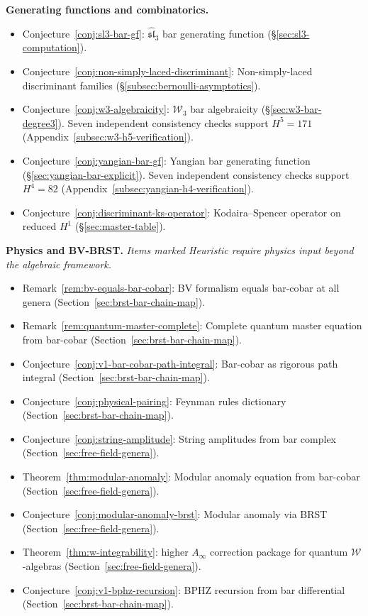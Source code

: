 \smallskip
\noindent\textbf{Generating functions and combinatorics.}
\begin{itemize}[nosep]
\item Conjecture~\ref{conj:sl3-bar-gf}:
 $\widehat{\mathfrak{sl}}_3$ bar generating function
 (\S\ref{sec:sl3-computation}).
\item Conjecture~\ref{conj:non-simply-laced-discriminant}:
 Non-simply-laced discriminant families
 (\S\ref{subsec:bernoulli-asymptotics}).
\item Conjecture~\ref{conj:w3-algebraicity}:
 $\mathcal{W}_3$ bar algebraicity
 (\S\ref{sec:w3-bar-degree3}).
 Seven independent consistency checks support $H^5 = 171$
 (Appendix~\ref{subsec:w3-h5-verification}).
\item Conjecture~\ref{conj:yangian-bar-gf}:
 Yangian bar generating function
 (\S\ref{sec:yangian-bar-explicit}).
 Seven independent consistency checks support $H^4 = 82$
 (Appendix~\ref{subsec:yangian-h4-verification}).
\item Conjecture~\ref{conj:discriminant-ks-operator}:
 Kodaira--Spencer operator on reduced $H^1$
 (\S\ref{sec:master-table}).
\end{itemize}

\smallskip
\noindent\textbf{Physics and BV-BRST.}
\emph{Items marked Heuristic require physics input beyond the algebraic framework.}

\begin{itemize}[nosep]
\item Remark~\ref{rem:bv-equals-bar-cobar}:
 BV formalism equals bar-cobar at all genera
 (Section~\ref{sec:brst-bar-chain-map}).
\item Remark~\ref{rem:quantum-master-complete}:
 Complete quantum master equation from bar-cobar
 (Section~\ref{sec:brst-bar-chain-map}).
\item Conjecture~\ref{conj:v1-bar-cobar-path-integral}:
 Bar-cobar as rigorous path integral
 (Section~\ref{sec:brst-bar-chain-map}).
\item Conjecture~\ref{conj:physical-pairing}:
 Feynman rules dictionary
 (Section~\ref{sec:brst-bar-chain-map}).
\item Conjecture~\ref{conj:string-amplitude}:
 String amplitudes from bar complex
 (Section~\ref{sec:free-field-genera}).
\item Theorem~\ref{thm:modular-anomaly}:
 Modular anomaly equation from bar-cobar
 (Section~\ref{sec:free-field-genera}).
\item Conjecture~\ref{conj:modular-anomaly-brst}:
 Modular anomaly via BRST
 (Section~\ref{sec:free-field-genera}).
\item Theorem~\ref{thm:w-integrability}:
 higher $A_\infty$ correction package for quantum
 $\mathcal{W}$-algebras
 (Section~\ref{sec:free-field-genera}).
\item Conjecture~\ref{conj:v1-bphz-recursion}:
 BPHZ recursion from bar differential
 (Section~\ref{sec:brst-bar-chain-map}).
\end{itemize}


